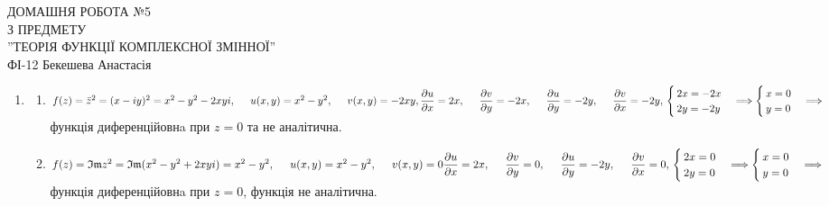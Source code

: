 \documentclass[a4paper,12pt]{article}
\newcommand\tab[1][0.5cm]{\hspace*{#1}}
\renewcommand{\Im}[0]{\mathfrak{Im}}
\begin{document}
	\begin{justify}
		\thispagestyle{empty}\setlength{\parindent}{0pt}
 		\vspace*{\fill}
  		\begin{center}
  			\noindent\makebox[\linewidth]{\rule{\paperwidth}{0.4pt}}
   			\LARGE{\bigbreak ДОМАШНЯ РОБОТА №5\\З ПРЕДМЕТУ\\''ТЕОРІЯ ФУНКЦІЇ КОМПЛЕКСНОЇ ЗМІННОЇ''\\\bigbreak} 
   			ФІ-12 Бекешева Анастасія 
   			\noindent\makebox[\linewidth]{\rule{\paperwidth}{0.4pt}}
  		\end{center}
 		\vspace*{\fill}\newpage
 		\begin{enumerate}
 		\item \begin{enumerate} 
 			\item $f(z)=\bar{z}^2=(x-iy)^2=x^2-y^2-2xyi,\tab u(x,y)=x^2-y^2,\tab v(x,y)=-2xy,\\\dfrac{\partial u}{\partial x}=2x,\tab\dfrac{\partial v}{\partial y}=-2x,\tab \dfrac{\partial u}{\partial y}=-2y,\tab\dfrac{\partial v}{\partial x}=-2y,\\\begin{cases}
 				2x=-2x\\2y=-2y
 			\end{cases}\Longrightarrow\begin{cases}
 				x=0\\y=0
 			\end{cases}\Longrightarrow\\$ функція диференційовнa при $z=0$ та не аналітична.
 			\item $f(z)=\Im z^2=\Im(x^2-y^2+2xyi)=x^2-y^2,\tab u(x,y)=x^2-y^2,\tab v(x,y)=0\\\dfrac{\partial u}{\partial x}=2x,\tab\dfrac{\partial v}{\partial y}=0,\tab \dfrac{\partial u}{\partial y}=-2y,\tab\dfrac{\partial v}{\partial x}=0,\\\begin{cases}
 				2x=0\\2y=0
 			\end{cases}\Longrightarrow\begin{cases}
 				x=0\\y=0
 			\end{cases}\Longrightarrow\\$ функція диференційовнa при $z=0$, функція не аналітична.
 		\end{enumerate}

\end{enumerate}
\end{justify}
\end{document}
